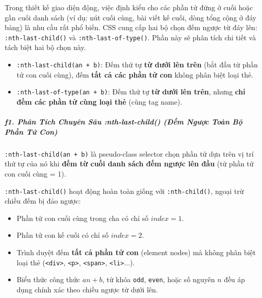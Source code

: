 \documentclass[11pt,oneside]{book}
\newcommand{\codeinline}[1]{\textcolor{accentOrange}{\texttt{#1}}}
\begin{document}
Trong thiết kế giao diện động, việc định kiểu cho các phần tử đứng ở cuối hoặc gần cuối danh sách (ví dụ: nút cuối cùng, bài viết kế cuối, dòng tổng cộng ở đáy bảng) là nhu cầu rất phổ biến. CSS cung cấp hai bộ chọn đếm ngược từ đáy lên: \codeinline{:nth-last-child()} và \codeinline{:nth-last-of-type()}. Phần này sẽ phân tích chi tiết và tách biệt hai bộ chọn này.

\begin{conceptBox}
\begin{itemize}[leftmargin=1.5em, itemsep=3pt, parsep=0pt]
    \item \codeinline{:nth-last-child(an + b)}: Đếm thứ tự \textbf{từ dưới lên trên} (bắt đầu từ phần tử con cuối cùng), đếm \textbf{tất cả các phần tử con} không phân biệt loại thẻ.
    \item \codeinline{:nth-last-of-type(an + b)}: Đếm thứ tự \textbf{từ dưới lên trên}, nhưng \textbf{chỉ đếm các phần tử cùng loại thẻ} (cùng tag name).
\end{itemize}
\end{conceptBox}


\subparagraph{f1. Phân Tích Chuyên Sâu :nth-last-child() (Đếm Ngược Toàn Bộ Phần Tử Con)}

\codeinline{:nth-last-child(an + b)} là pseudo-class selector chọn phần tử dựa trên vị trí thứ tự của nó khi \textbf{đếm từ cuối danh sách đếm ngược lên đầu} (từ phần tử con cuối cùng = 1).

\begin{conceptBox}
\codeinline{:nth-last-child()} hoạt động hoàn toàn giống với \codeinline{:nth-child()}, ngoại trừ chiều đếm bị đảo ngược:
\begin{itemize}[leftmargin=1.5em, itemsep=2pt, parsep=0pt]
    \item Phần tử con cuối cùng trong cha có chỉ số $index = 1$.
    \item Phần tử con kế cuối có chỉ số $index = 2$.
    \item Trình duyệt đếm \textbf{tất cả phần tử con} (element nodes) mà không phân biệt loại thẻ (\codeinline{<div>}, \codeinline{<p>}, \codeinline{<span>}, \codeinline{<li>}...).
    \item Biểu thức công thức $an + b$, từ khóa \codeinline{odd}, \codeinline{even}, hoặc số nguyên $n$ đều áp dụng chính xác theo chiều ngược từ dưới lên.
\end{itemize}
\end{conceptBox}
\end{document}

